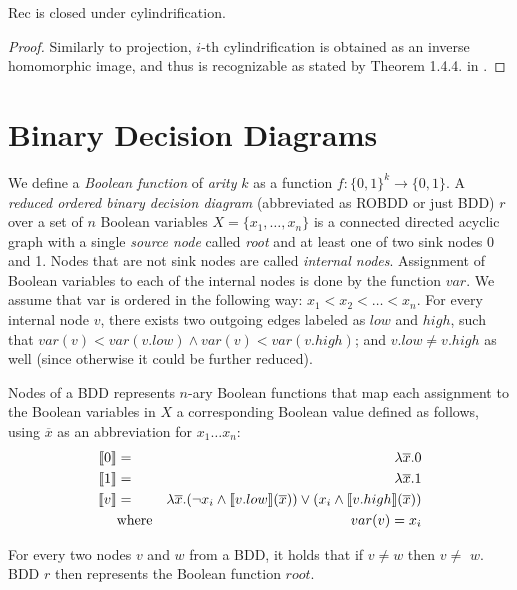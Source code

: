 \begin{lemma}
Rec is closed under cylindrification.
\end{lemma}

\begin{proof}
 Similarly to projection, $i$-th cylindrification is obtained as an inverse
 homomorphic image, and thus is recognizable as stated by Theorem 1.4.4. in
 \cite{tata}.
\end{proof}

 \section{Binary Decision Diagrams}\label{bdd}

We define a \emph{Boolean function} of \emph{arity} $k$ as a function $f :
\{0,1\}^k \longrightarrow \{0,1\}$. A \emph{reduced ordered binary decision
diagram} (abbreviated as ROBDD or just BDD) $r$ over a set of $n$ Boolean
variables $X = \{x_1,\ldots,x_n\}$ is a connected directed acyclic graph with a
single \emph{source node} called \emph{root} and at least one of two sink nodes
0 and 1. Nodes that are not sink nodes are called \emph{internal nodes}.
Assignment of Boolean variables to each of the internal nodes is done by the
function $var$. We assume that var is ordered in the following way: $x_1 < x_2 <
\ldots < x_n$.
For every internal node $v$, there exists two outgoing edges labeled as $low$
and $high$, such that $var(v) < var(v.low) \wedge var(v) < var(v.high)$; and
$v.low \neq v.high$ as well (since otherwise it could be further reduced).

Nodes of a BDD represents $n$-ary Boolean functions that map each assignment to
the Boolean variables in $X$ a corresponding Boolean value defined as follows,
using $\overline{x}$ as an abbreviation for $x_1\ldots x_n$:
\begin{eqnarray*}
 \text{\textlbrackdbl} 0\text{\textrbrackdbl} & = & \lambda\overline{x}.0\\
 \text{\textlbrackdbl} 1\text{\textrbrackdbl} & = & \lambda\overline{x}.1\\
 \text{\textlbrackdbl} v\text{\textrbrackdbl} & = & \lambda\overline{x}.(\neg
 x_i \wedge \text{\textlbrackdbl} v.low\text{\textrbrackdbl}(\overline{x})) \vee
 (x_i \wedge \text{\textlbrackdbl} v.high\text{\textrbrackdbl}(\overline{x}))\\
       & \text{where} & var(v) = x_i
\end{eqnarray*}

For every two nodes $v$ and $w$ from a BDD, it holds that if $v \neq w$ then
\textlbrackdbl $v$\textrbrackdbl$ \neq$ \textlbrackdbl $w$\textrbrackdbl. BDD
$r$ then represents the Boolean function \textlbrackdbl $root$\textrbrackdbl.

